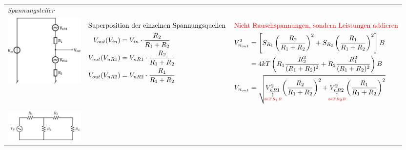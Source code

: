\begin{longtable}[t]{|p{4cm}|p{5.2cm}|p{7cm}|}    
    \hline 
    \multicolumn{3}{|l|}{\textit{Spannungsteiler}}
    \\ \hdashline
    \includegraphics[width=4cm, valign=t]{pictures/RauschenSpannungsteiler.png}
    & {\begin{align*}
            \intertext{Superposition der einzelnen Spannungsquellen}
            V_{out}(V_{in}) &= V_{in} \cdot \frac{R_2}{R_1 + R_2}\\
            V_{out}(V_{nR1}) &= V_{nR1} \cdot \frac{R_2}{R_1 + R_2}\\
            V_{out}(V_{nR2}) &= V_{nR2} \cdot \frac{R_1}{R_1 + R_2}
        \end{align*}
      }
    & {\begin{align*}
            \intertext{\textcolor{red}{Nicht Rauschspannungen, sondern Leistungen addieren}}
            V_{n_{out}}^2 &= \left[ S_{R_1}\left( \frac{R_2}{R_1 + R_2}\right) ^2 + S_{R_2}\left( \frac{R_1}{R_1 + R_2}\right) ^2\right] B \\
            &= 4kT\left( R_1 \frac{R_2^2}{(R_1+R_2)^2} + R_2 \frac{R_1^2}{(R_1+R_2)^2}\right) B\\
            V_{n_{out}} &= \sqrt{\mathrel{\mathop{V_{nR1}^2}\limits_{\substack{\uparrow\\\hbox to 0pt{\hss{\textcolor{red}{\tiny $4kT R_1 B$}}\hss}}}} \left( \frac{R_2}{R_1+R_2}\right) ^2 + \mathrel{\mathop{V_{nR2}^2}\limits_{\substack{\uparrow\\\hbox to 0pt{\hss{\textcolor{red}{\tiny $4kT R_2 B$}}\hss}}}} \left( \frac{R_1}{R_1+R_2}\right) ^2}
        \end{align*}
      }
    \\ \hdashline
    \includegraphics[width=4cm, valign=t]{pictures/seriewiderstand1.png}\newline

\end{longtable}
